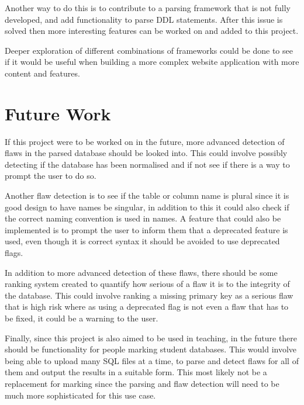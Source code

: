 Another way to do this is to contribute to a parsing framework that is not fully developed, and add functionality to parse DDL statements. After this issue is solved then more interesting features can be worked on and added to this project.

Deeper exploration of different combinations of frameworks could be done to see if it would be useful when building a more complex website application with more content and features. 

\section{Future Work}

If this project were to be worked on in the future, more advanced detection of flaws in the parsed database should be looked into. This could involve possibly detecting if the database has been normalised and if not see if there is a way to prompt the user to do so. 

Another flaw detection is to see if the table or column name is plural since it is good design to have names be singular, in addition to this it could also check if the correct naming convention is used in names. A feature that could also be implemented is to prompt the user to inform them that a deprecated feature is used, even though it is correct syntax it should be avoided to use deprecated flags.

In addition to more advanced detection of these flaws, there should be some ranking system created to quantify how serious of a flaw it is to the integrity of the database. This could involve ranking a missing primary key as a serious flaw that is high risk where as using a deprecated flag is not even a flaw that has to be fixed, it could be a warning to the user.

Finally, since this project is also aimed to be used in teaching, in the future there should be functionality for people marking student databases. This would involve being able to upload many SQL files at a time, to parse and detect flaws for all of them and output the results in a suitable form. This most likely not be a replacement for marking since the parsing and flaw detection will need to be much more sophisticated for this use case.